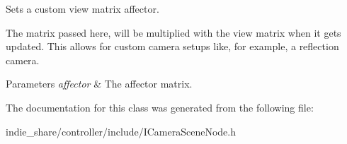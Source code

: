 Sets a custom view matrix affector. 

The matrix passed here, will be multiplied with the view matrix when it gets updated. This allows for custom camera setups like, for example, a reflection camera. 
\begin{DoxyParams}{Parameters}
{\em affector} & The affector matrix. \\
\hline
\end{DoxyParams}


The documentation for this class was generated from the following file\+:\begin{DoxyCompactItemize}
\item 
indie\+\_\+share/controller/include/I\+Camera\+Scene\+Node.\+h\end{DoxyCompactItemize}
